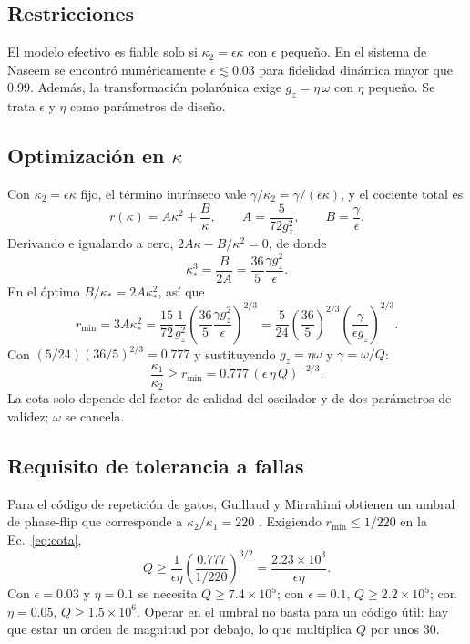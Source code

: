 \documentclass[11pt]{report}
\begin{document}
\subsection{Restricciones}

El modelo efectivo es fiable solo si $\kappa_{2}=\epsilon\kappa$ con $\epsilon$ peque\~no. En el sistema de Naseem se encontr\'o num\'ericamente $\epsilon\lesssim0.03$ para fidelidad din\'amica mayor que 0.99. Adem\'as, la transformaci\'on polar\'onica exige $g_{z}=\eta\,\omega$ con $\eta$ peque\~no. Se trata $\epsilon$ y $\eta$ como par\'ametros de dise\~no.

\subsection{Optimizaci\'on en $\kappa$}

Con $\kappa_{2}=\epsilon\kappa$ fijo, el t\'ermino intr\'inseco vale $\gamma/\kappa_{2}=\gamma/(\epsilon\kappa)$, y el cociente total es
\begin{equation}
r(\kappa)=A\kappa^{2}+\frac{B}{\kappa},\qquad A=\frac{5}{72g_{z}^{2}},\qquad B=\frac{\gamma}{\epsilon}.
\end{equation}
Derivando e igualando a cero, $2A\kappa-B/\kappa^{2}=0$, de donde
\begin{equation}
\kappa_{*}^{3}=\frac{B}{2A}=\frac{36}{5}\frac{\gamma g_{z}^{2}}{\epsilon}.
\end{equation}
En el \'optimo $B/\kappa_{*}=2A\kappa_{*}^{2}$, as\'i que
\begin{equation}
r_{\min}=3A\kappa_{*}^{2}=\frac{15}{72}\frac{1}{g_{z}^{2}}\left(\frac{36}{5}\frac{\gamma g_{z}^{2}}{\epsilon}\right)^{2/3}
=\frac{5}{24}\left(\frac{36}{5}\right)^{2/3}\left(\frac{\gamma}{\epsilon g_{z}}\right)^{2/3}.
\end{equation}
Con $(5/24)(36/5)^{2/3}=0.777$ y sustituyendo $g_{z}=\eta\omega$ y $\gamma=\omega/Q$:
\begin{equation}
\boxed{\frac{\kappa_{1}}{\kappa_{2}}\geq r_{\min}=0.777\,\left(\epsilon\,\eta\,Q\right)^{-2/3}}.
\label{eq:cota}
\end{equation}
La cota solo depende del factor de calidad del oscilador y de dos par\'ametros de validez; $\omega$ se cancela.

\subsection{Requisito de tolerancia a fallas}

Para el c\'odigo de repetici\'on de gatos, Guillaud y Mirrahimi obtienen un umbral de phase-flip que corresponde a $\kappa_{2}/\kappa_{1}=220$ \cite{GuillaudMirrahimi2021}. Exigiendo $r_{\min}\leq1/220$ en la Ec.~\eqref{eq:cota},
\begin{equation}
Q\geq\frac{1}{\epsilon\eta}\left(\frac{0.777}{1/220}\right)^{3/2}=\frac{2.23\times10^{3}}{\epsilon\eta}.
\end{equation}
Con $\epsilon=0.03$ y $\eta=0.1$ se necesita $Q\geq7.4\times10^{5}$; con $\epsilon=0.1$, $Q\geq2.2\times10^{5}$; con $\eta=0.05$, $Q\geq1.5\times10^{6}$. Operar en el umbral no basta para un c\'odigo \'util: hay que estar un orden de magnitud por debajo, lo que multiplica $Q$ por unos 30.
\end{document}
